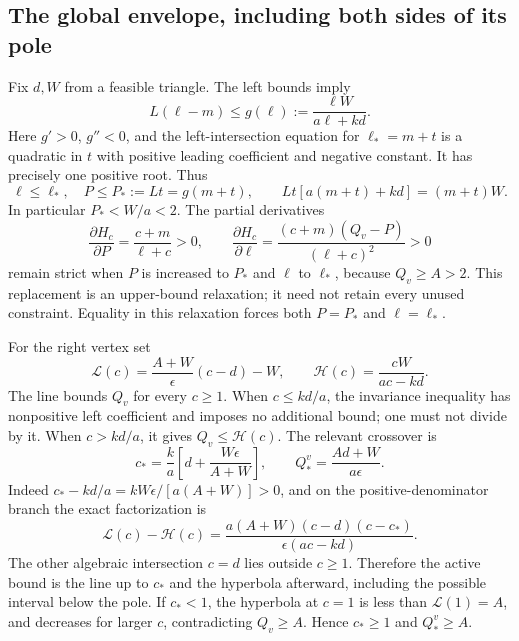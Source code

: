 \subsection{The global envelope, including both sides of its pole}
Fix $d,W$ from a feasible triangle. The left bounds imply
\begin{equation}
 L(\ell-m)\le g(\ell):=\frac{\ell W}{a\ell+kd}.
\end{equation}
Here $g'>0$, $g''<0$, and the left-intersection equation for
$\ell_*=m+t$ is a quadratic in $t$ with positive leading coefficient and
negative constant. It has precisely one positive root. Thus
\begin{equation}
 \ell\le\ell_*,\quad P\le P_*:=Lt=g(m+t),\qquad
 Lt[a(m+t)+kd]=(m+t)W.\label{eq:leftmax}
\end{equation}
In particular $P_*<W/a<2$. The partial derivatives
\begin{equation}
 \frac{\partial H_c}{\partial P}=\frac{c+m}{\ell+c}>0,
 \qquad
 \frac{\partial H_c}{\partial\ell}
 =\frac{(c+m)(Q_v-P)}{(\ell+c)^2}>0
\end{equation}
remain strict when $P$ is increased to $P_*$ and $\ell$ to $\ell_*$,
because $Q_v\ge A>2$. This replacement is an upper-bound relaxation;
it need not retain every unused constraint. Equality in this relaxation
forces both $P=P_*$ and $\ell=\ell_*$.

For the right vertex set
\begin{equation}
 \mathcal L(c)=\frac{A+W}{\epsilon}(c-d)-W,
 \qquad \mathcal H(c)=\frac{cW}{ac-kd}.
\end{equation}
The line bounds $Q_v$ for every $c\ge1$. When $c\le kd/a$, the
invariance inequality has nonpositive left coefficient and imposes no
additional bound; one must not divide by it. When $c>kd/a$, it gives
$Q_v\le\mathcal H(c)$. The relevant crossover is
\begin{equation}
 c_* =\frac{k}{a}\left[d+\frac{W\epsilon}{A+W}\right],\qquad
 Q_*^v=\frac{Ad+W}{a\epsilon}.\label{eq:rightmax}
\end{equation}
Indeed $c_*-kd/a=kW\epsilon/[a(A+W)]>0$, and on the positive-denominator
branch the exact factorization is
\begin{equation}
 \mathcal L(c)-\mathcal H(c)
 =\frac{a(A+W)(c-d)(c-c_*)}{\epsilon(ac-kd)}.
\end{equation}
The other algebraic intersection $c=d$ lies outside $c\ge1$.
Therefore the active bound is the line up to $c_*$ and the hyperbola
afterward, including the possible interval below the pole. If $c_*<1$,
the hyperbola at $c=1$ is less than $\mathcal L(1)=A$, and decreases for
larger $c$, contradicting $Q_v\ge A$. Hence $c_*\ge1$ and $Q_*^v\ge A$.

